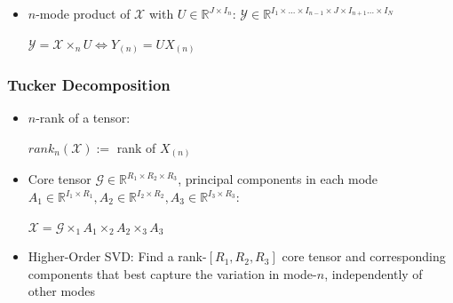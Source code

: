 \documentclass{beamer}
\begin{document}
\begin{frame}
\begin{itemize}
\begin{center}
\end{center}
\item $n$-mode product of $\mathcal{X}$ with $U \in \mathbb{R}^{J\times I_n}$: $\mathcal{Y} \in  \mathbb{R}^{I_1\times...\times I_{n-1}\times J \times I_{n+1}... \times I_N} $\\ \begin{center} $\mathcal{Y}=\mathcal{X}\times_n U \iff Y_{(n)}=UX_{(n)}$  \end{center}
\end{itemize} 
\end{frame}

\begin{frame}
\frametitle{Tucker Decomposition}
\begin{itemize}
\item $n$-rank of a tensor: \\ \begin{center} $rank_n(\mathcal{X}):=$ rank of $X_{(n)}$\end{center}
\item Core tensor $\mathcal{G}\in \mathbb{R}^{R_1\times R_2\times R_3}$, principal components in each mode $A_1\in \mathbb{R}^{I_1\times R_1},A_2\in \mathbb{R}^{I_2\times R_2}, A_3\in \mathbb{R}^{I_3\times R_3}$:\\ \begin{center} $ \mathcal{X} =  \mathcal{G} \times_1 A_1\times_2 A_2 \times_3 A_3$\end{center}
\item Higher-Order SVD: Find a rank-$[R_1,R_2,R_3]$ core tensor and corresponding components that best capture the variation in mode-$n$, independently of other modes%
\end{itemize}
\end{frame}
\end{document}
